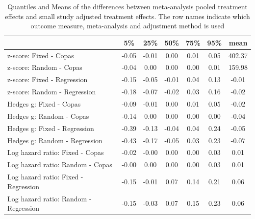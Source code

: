 \documentclass[11pt,a4paper,twoside]{book}\usepackage[]{graphicx}\usepackage[]{color}
\begin{document}
\begin{table}[ht]
\centering
\begingroup\scriptsize
\begin{tabular}{lcccccc}
  \hline
 & 5\% & 25\% & 50\% & 75\% & 95\% & mean \\ 
  \hline
z-score: Fixed - Copas & -0.05 & -0.01 & 0.00 & 0.01 & 0.05 & 402.37 \\ 
  z-score: Random - Copas & -0.04 & 0.00 & 0.00 & 0.00 & 0.01 & 159.98 \\ 
  z-score: Fixed - Regression & -0.15 & -0.05 & -0.01 & 0.04 & 0.13 & -0.01 \\ 
  z-score: Random - Regression & -0.18 & -0.07 & -0.02 & 0.03 & 0.16 & -0.02 \\ 
  Hedges g: Fixed - Copas & -0.09 & -0.01 & 0.00 & 0.01 & 0.05 & -0.02 \\ 
  Hedges g: Random - Copas & -0.14 & 0.00 & 0.00 & 0.00 & 0.00 & -0.04 \\ 
  Hedges g: Fixed - Regression & -0.39 & -0.13 & -0.04 & 0.04 & 0.24 & -0.05 \\ 
  Hedges g: Random - Regression & -0.43 & -0.17 & -0.05 & 0.03 & 0.23 & -0.07 \\ 
  Log hazard ratio: Fixed - Copas & -0.02 & -0.00 & 0.00 & 0.00 & 0.03 & 0.01 \\ 
  Log hazard ratio: Random - Copas & -0.00 & 0.00 & 0.00 & 0.00 & 0.03 & 0.01 \\ 
  Log hazard ratio: Fixed - Regression & -0.15 & -0.01 & 0.07 & 0.14 & 0.21 & 0.06 \\ 
  Log hazard ratio: Random - Regression & -0.15 & -0.03 & 0.07 & 0.15 & 0.23 & 0.06 \\ 
   \hline
\end{tabular}
\endgroup
\caption{Quantiles and Means of the differences between meta-analysis pooled treatment effects and small study adjusted treatment effects. The row names indicate which outcome measure, meta-analysis and adjustment method is used} 
\label{adjustment.difference}
\end{table}
\end{document}
